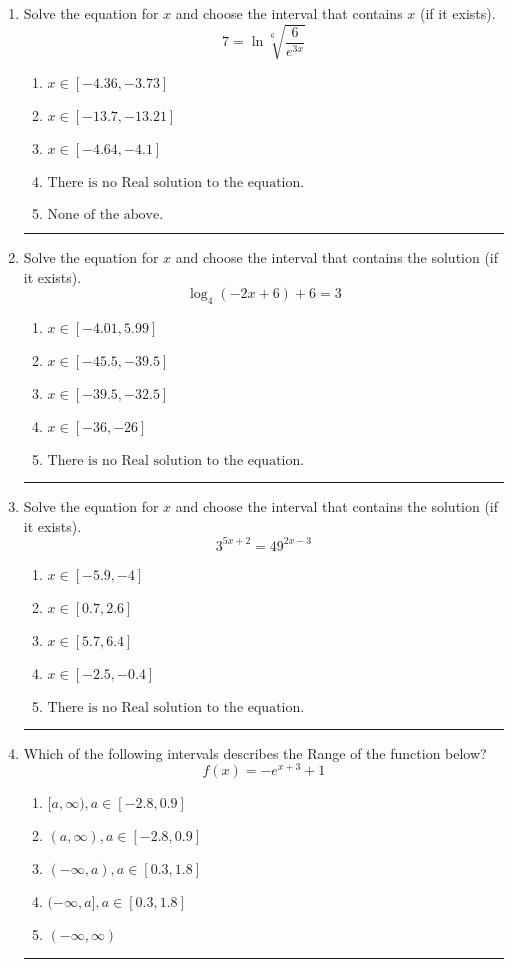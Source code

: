 \documentclass[14pt]{extbook}
\newcommand{\litem}[1]{\item#1\hspace*{-1cm}\rule{\textwidth}{0.4pt}}
\begin{document}
\begin{enumerate}
\litem{
 Solve the equation for $x$ and choose the interval that contains $x$ (if it exists).\[  7 = \ln{\sqrt[6]{\frac{6}{e^{3x}}}} \]\begin{enumerate}[label=\Alph*.]
\item \( x \in [-4.36, -3.73] \)
\item \( x \in [-13.7, -13.21] \)
\item \( x \in [-4.64, -4.1] \)
\item \( \text{There is no Real solution to the equation.} \)
\item \( \text{None of the above.} \)

\end{enumerate} }
\litem{
Solve the equation for $x$ and choose the interval that contains the solution (if it exists).\[ \log_{4}{(-2x+6)}+6 = 3 \]\begin{enumerate}[label=\Alph*.]
\item \( x \in [-4.01, 5.99] \)
\item \( x \in [-45.5, -39.5] \)
\item \( x \in [-39.5, -32.5] \)
\item \( x \in [-36, -26] \)
\item \( \text{There is no Real solution to the equation.} \)

\end{enumerate} }
\litem{
Solve the equation for $x$ and choose the interval that contains the solution (if it exists).\[ 3^{5x+2} = 49^{2x-3} \]\begin{enumerate}[label=\Alph*.]
\item \( x \in [-5.9, -4] \)
\item \( x \in [0.7, 2.6] \)
\item \( x \in [5.7, 6.4] \)
\item \( x \in [-2.5, -0.4] \)
\item \( \text{There is no Real solution to the equation.} \)

\end{enumerate} }
\litem{
Which of the following intervals describes the Range of the function below?\[ f(x) = -e^{x+3}+1 \]\begin{enumerate}[label=\Alph*.]
\item \( [a, \infty), a \in [-2.8, 0.9] \)
\item \( (a, \infty), a \in [-2.8, 0.9] \)
\item \( (-\infty, a), a \in [0.3, 1.8] \)
\item \( (-\infty, a], a \in [0.3, 1.8] \)
\item \( (-\infty, \infty) \)


\end{enumerate}}
\end{enumerate}
\end{document}
